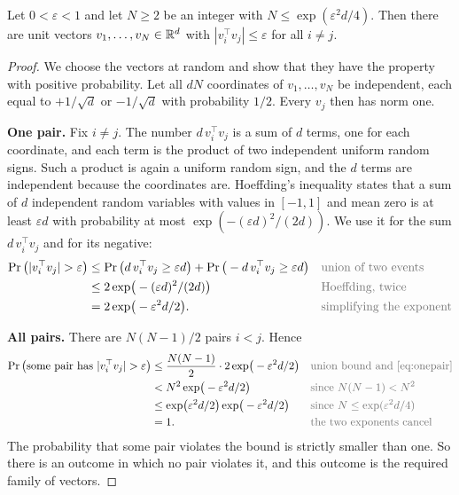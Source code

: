 \begin{proposition}\label{prop:jl}
Let $0<\varepsilon<1$ and let $N\ge 2$ be an integer with $N\le\exp(\varepsilon^2d/4)$. Then there are unit
vectors $v_1,\dots,v_N\in\mathbb{R}^d$ with $|v_i^\top v_j|\le\varepsilon$ for all $i\ne j$.
\end{proposition}
\begin{proof}
We choose the vectors at random and show that they have the property with positive probability. Let all $dN$
coordinates of $v_1,\dots,v_N$ be independent, each equal to $+1/\sqrt d$ or $-1/\sqrt d$ with probability $1/2$.
Every $v_j$ then has norm one.

\textbf{One pair.} Fix $i\ne j$. The number $d\,v_i^\top v_j$ is a sum of $d$ terms, one for each coordinate, and
each term is the product of two independent uniform random signs. Such a product is again a uniform random
sign, and the $d$ terms are independent because the coordinates are. Hoeffding's inequality
\citep[Theorem 2]{hoeffding1963probability} states that a sum of $d$ independent random variables with values in
$[-1,1]$ and mean zero is at least $\varepsilon d$ with probability at most $\exp(-(\varepsilon d)^2/(2d))$. We
use it for the sum $d\,v_i^\top v_j$ and for its negative:
\begin{align}
\Pr\big(|v_i^\top v_j|>\varepsilon\big)
&\le \Pr\big(d\,v_i^\top v_j\ge\varepsilon d\big)+\Pr\big(-d\,v_i^\top v_j\ge\varepsilon d\big) && \by{union of two events}\notag\\
&\le 2\exp\!\big(-(\varepsilon d)^2/(2d)\big) && \by{Hoeffding, twice}\notag\\
&= 2\exp\!\big(-\varepsilon^2d/2\big). && \by{simplifying the exponent} \label{eq:onepair}
\end{align}

\textbf{All pairs.} There are $N(N-1)/2$ pairs $i<j$. Hence
\begin{align*}
\Pr\big(\text{some pair has }|v_i^\top v_j|>\varepsilon\big)
&\le \frac{N(N-1)}{2}\cdot 2\exp\!\big(-\varepsilon^2d/2\big) && \by{union bound and \eqref{eq:onepair}}\\
&< N^2\exp\!\big(-\varepsilon^2d/2\big) && \by{since $N(N-1)<N^2$}\\
&\le \exp\!\big(\varepsilon^2d/2\big)\exp\!\big(-\varepsilon^2d/2\big) && \by{since $N\le\exp(\varepsilon^2d/4)$}\\
&= 1. && \by{the two exponents cancel}
\end{align*}
The probability that some pair violates the bound is strictly smaller than one. So there is an outcome in
which no pair violates it, and this outcome is the required family of vectors.
\end{proof}

